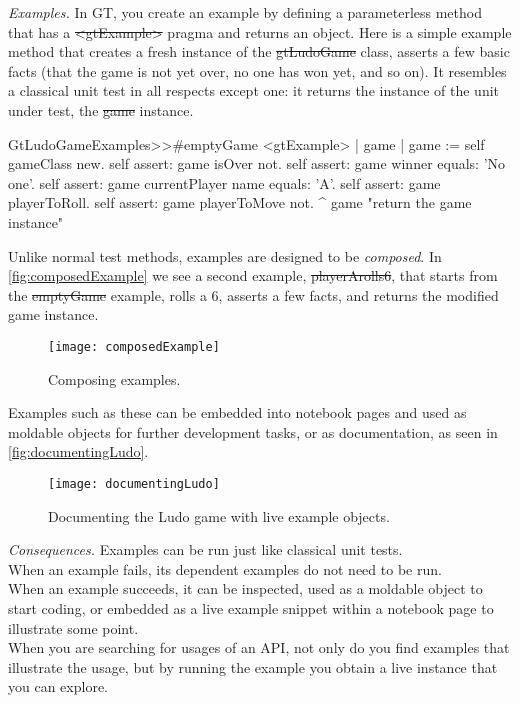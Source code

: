 \documentclass[acmsmall,screen,authorversion,nonacm]{acmart} %
\newcommand\dd[1]{\nbe{Daniel}{#1}{magenta}} %
\newcommand{\patsec}[1]{\noindent\textit{#1.}\xspace}
\begin{document}
\patsec{Examples}
In GT, you create an example by defining a parameterless method that has a \st{<gtExample>} pragma and returns an object.
Here is a simple example method that creates a fresh instance of the \st{gtLudoGame} class, asserts a few basic facts (\ie that the game is not yet over, no one has won yet, and so on).
It resembles a classical unit test in all respects except one: it returns the instance of the unit under test, \ie the \st{game} instance.


\begin{code}
GtLudoGameExamples>>#emptyGame
	<gtExample>
	| game |
	game := self gameClass new.
	self assert: game isOver not.
	self assert: game winner equals: 'No one'.
	self assert: game currentPlayer name equals: 'A'.
	self assert: game playerToRoll.
	self assert: game playerToMove not.
	^ game  "return the game instance"
\end{code}

Unlike normal test methods, examples are designed to be \emph{composed}.
In \autoref{fig:composedExample} we see a second example, \st{playerArolls6}, that starts from the \st{emptyGame} example, rolls a $6$, asserts a few facts, and returns the modified game instance.

\begin{figure}[h]
  \texttt{[image: composedExample]}
  \caption{Composing examples.}
  \label{fig:composedExample}
\end{figure}

Examples such as these can be embedded into notebook pages and used as moldable objects for further development tasks, or as documentation, as seen in \autoref{fig:documentingLudo}.

\begin{figure}[h]
  \texttt{[image: documentingLudo]}
  \caption{Documenting the Ludo game with live example objects.}
  \label{fig:documentingLudo}
\end{figure}

    
\patsec{Consequences}
Examples can be run just like classical unit tests.\\
When an example fails, its dependent examples do not need to be run.\\
When an example succeeds, it can be inspected, used as a moldable object to start coding, or embedded as a live example snippet within a notebook page to illustrate some point.\\
When you are searching for usages of an API, not only do you find examples that illustrate the usage, but by running the example you obtain a live instance that you can explore.
\end{document}
